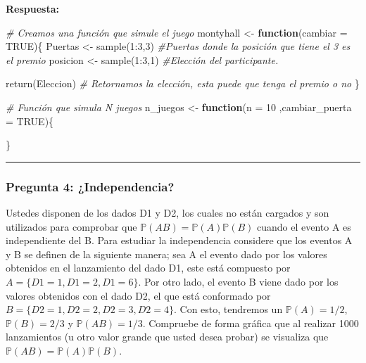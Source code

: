 \documentclass[]{article}
\newenvironment{Shaded}{\begin{snugshade}}{\end{snugshade}}
\newcommand{\AttributeTok}[1]{\textcolor[rgb]{0.77,0.63,0.00}{#1}}
\newcommand{\CommentTok}[1]{\textcolor[rgb]{0.56,0.35,0.01}{\textit{#1}}}
\newcommand{\ConstantTok}[1]{\textcolor[rgb]{0.00,0.00,0.00}{#1}}
\newcommand{\ControlFlowTok}[1]{\textcolor[rgb]{0.13,0.29,0.53}{\textbf{#1}}}
\newcommand{\DecValTok}[1]{\textcolor[rgb]{0.00,0.00,0.81}{#1}}
\newcommand{\FunctionTok}[1]{\textcolor[rgb]{0.00,0.00,0.00}{#1}}
\newcommand{\NormalTok}[1]{#1}
\newcommand{\OtherTok}[1]{\textcolor[rgb]{0.56,0.35,0.01}{#1}}
\newcommand{\SpecialCharTok}[1]{\textcolor[rgb]{0.00,0.00,0.00}{#1}}
\begin{document}
\textbf{Respuesta:}

\begin{Shaded}
\begin{Highlighting}[]
\CommentTok{\# Creamos una función que simule el juego}
\NormalTok{montyhall }\OtherTok{\textless{}{-}} \ControlFlowTok{function}\NormalTok{(}\AttributeTok{cambiar =} \ConstantTok{TRUE}\NormalTok{)\{}
\NormalTok{  Puertas }\OtherTok{\textless{}{-}} \FunctionTok{sample}\NormalTok{(}\DecValTok{1}\SpecialCharTok{:}\DecValTok{3}\NormalTok{,}\DecValTok{3}\NormalTok{)             }\CommentTok{\#Puertas donde la posición que tiene el 3 es el premio}
\NormalTok{  posicion }\OtherTok{\textless{}{-}} \FunctionTok{sample}\NormalTok{(}\DecValTok{1}\SpecialCharTok{:}\DecValTok{3}\NormalTok{,}\DecValTok{1}\NormalTok{)            }\CommentTok{\#Elección del participante.}
  
  \FunctionTok{return}\NormalTok{(Eleccion) }\CommentTok{\# Retornamos la elección, esta puede que tenga el premio o no}
\NormalTok{\}}

\CommentTok{\# Función que simula N juegos}
\NormalTok{n\_juegos }\OtherTok{\textless{}{-}} \ControlFlowTok{function}\NormalTok{(}\AttributeTok{n =} \DecValTok{10}\NormalTok{ ,}\AttributeTok{cambiar\_puerta =} \ConstantTok{TRUE}\NormalTok{)\{}
  
\NormalTok{\}}
\end{Highlighting}
\end{Shaded}

\begin{center}\rule{0.5\linewidth}{0.5pt}\end{center}

\hypertarget{pregunta-4-independencia}{%
\subsubsection{Pregunta 4:
¿Independencia?}\label{pregunta-4-independencia}}

Ustedes disponen de los dados D1 y D2, los cuales no están cargados y
son utilizados para comprobar que
\(\mathbb{P}(AB)=\mathbb{P}(A)\mathbb{P}(B)\) cuando el evento A es
independiente del B. Para estudiar la independencia considere que los
eventos A y B se definen de la siguiente manera; sea A el evento dado
por los valores obtenidos en el lanzamiento del dado D1, este está
compuesto por \(A=\{D1=1,D1=2,D1=6\}\). Por otro lado, el evento B viene
dado por los valores obtenidos con el dado D2, el que está conformado
por \(B=\{D2=1,D2=2,D2=3,D2=4\}\). Con esto, tendremos un
\(\mathbb{P}(A)=1/2\), \(\mathbb{P}(𝐵)=2/3\) y \(\mathbb{P}(AB)=1/3\).
Compruebe de forma gráfica que al realizar 1000 lanzamientos (u otro
valor grande que usted desea probar) se visualiza que
\(\mathbb{P}(AB)=\mathbb{P}(A)\mathbb{P}(B)\).
\end{document}
